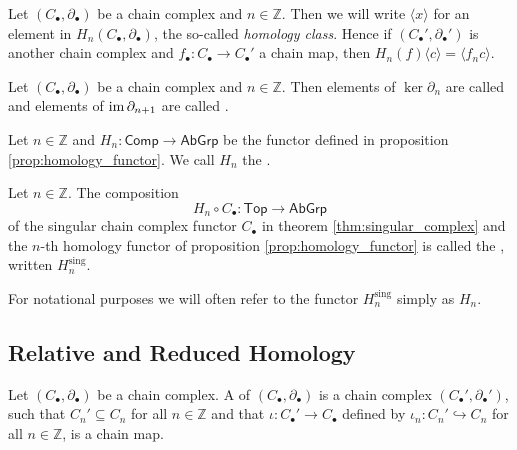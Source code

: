 \begin{remark}
	Let $(C_\bullet,\partial_\bullet)$ be a chain complex and $n \in \mathbb{Z}$. Then we will write $\langle x \rangle$ for an element in $H_n(C_\bullet,\partial_\bullet)$, the so-called \emph{homology class}. Hence if $(C_\bullet',\partial_\bullet')$ is another chain complex and $f_\bullet : C_\bullet \to C_\bullet'$ a chain map, then $H_n(f)\langle c \rangle = \langle f_nc\rangle$. 
\end{remark}

\begin{definition}
	Let $(C_\bullet,\partial_\bullet)$ be a chain complex and $n \in \mathbb{Z}$. Then elements of $\ker \partial_n$ are called  and elements of $\operatorname{im} \partial_{n + 1}$ are called .
\end{definition}

\begin{definition}
	Let $n \in \mathbb{Z}$ and $H_n : \mathsf{Comp} \to \mathsf{AbGrp}$ be the functor defined in proposition \ref{prop:homology_functor}. We call $H_n$ the .
\end{definition}

\begin{definition}
	Let $n \in \mathbb{Z}$. The composition 
	\begin{equation}
		H_n \circ C_\bullet : \mathsf{Top} \to \mathsf{AbGrp}
	\end{equation}
	\noindent of the singular chain complex functor $C_\bullet$ in theorem \ref{thm:singular_complex} and the $n$-th homology functor of proposition \ref{prop:homology_functor} is called the , written $H^{\mathrm{sing}}_n$.
\end{definition}

\begin{remark}
	For notational purposes we will often refer to the functor $H_n^{\mathrm{sing}}$ simply as $H_n$.
\end{remark}

\subsection*{Relative and Reduced Homology}
\begin{definition}[Subcomplex]
	Let $(C_\bullet,\partial_\bullet)$ be a chain complex. A  of $(C_\bullet,\partial_\bullet)$ is a chain complex $(C_\bullet',\partial_\bullet')$, such that $C_n' \subseteq C_n$ for all $n \in \mathbb{Z}$ and that $\iota : C_\bullet' \to C_\bullet$ defined by $\iota_n : C_n' \hookrightarrow C_n$ for all $n \in \mathbb{Z}$, is a chain map.
\end{definition}

